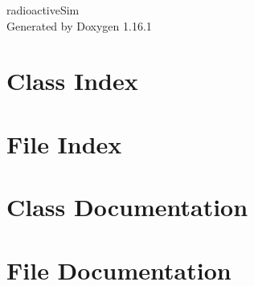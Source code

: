 \documentclass[twoside]{book}
\newcommand{\+}{\discretionary{\mbox{\scriptsize$\hookleftarrow$}}{}{}}
\newcommand{\clearemptydoublepage}{%
    \newpage{\pagestyle{empty}\cleardoublepage}%
  }
\begin{document}
  \raggedbottom
    \hypersetup{pageanchor=false,
                bookmarksnumbered=true,
                pdfencoding=unicode
               }
  \begin{titlepage}
  \vspace*{7cm}
  \begin{center}%
  {\Large radioactive\+Sim}\\
  \vspace*{1cm}
  {\large Generated by Doxygen 1.16.1}\\
  \end{center}
  \end{titlepage}
  \clearemptydoublepage
  \tableofcontents
  \clearemptydoublepage
  \hypersetup{pageanchor=true}
\chapter{Class Index}

\chapter{File Index}

\chapter{Class Documentation}










\chapter{File Documentation}































  \backmatter
  \newpage
  \clearemptydoublepage
  \printindex
\end{document}
